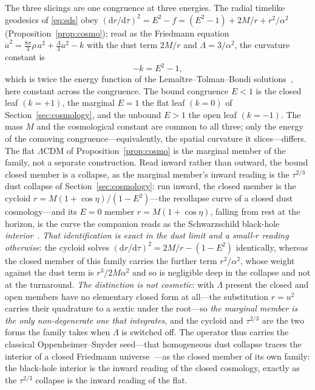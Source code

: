 \documentclass[11pt,a4paper]{article}
\theoremstyle{definition}
\newcommand{\dd}{\mathrm{d}}
\begin{document}
The three slicings are one congruence at three energies. The radial timelike geodesics of \eqref{eq:sds} obey $(\dd r/\dd\tau)^{2}=E^{2}-f=(E^{2}-1)+2M/r+r^{2}/\alpha^{2}$ (Proposition~\ref{prop:cosmo}); read as the Friedmann equation $\dot a^{2}=\tfrac{8\pi}{3}\rho\,a^{2}+\tfrac{\Lambda}{3}a^{2}-k$ with the dust term $2M/r$ and $\Lambda=3/\alpha^{2}$, the curvature constant is
\begin{equation}\label{eq:Ek}
-k=E^{2}-1,
\end{equation}
which is twice the energy function of the Lema\^itre--Tolman--Bondi solutions~\cite{Bondi1947}, here constant across the congruence.
The bound congruence $E<1$ is the closed leaf $(k=+1)$, the marginal $E=1$ the flat leaf $(k=0)$ of Section~\ref{sec:cosmology}, and the unbound $E>1$ the open leaf $(k=-1)$. The mass $M$ and the cosmological constant are common to all three; only the energy of the comoving congruence---equivalently, the spatial curvature it slices---differs. The flat $\Lambda$CDM of Proposition~\ref{prop:cosmo} is the marginal member of the family, not a separate construction. Read inward rather than outward, the bound closed member is a collapse, as the marginal member's inward reading is the $\tau^{2/3}$ dust collapse of Section~\ref{sec:cosmology}: run inward, the closed member is the cycloid $r=M(1+\cos\eta)/(1-E^{2})$---the recollapse curve of a closed dust cosmology---and its $E=0$ member $r=M(1+\cos\eta)$, falling from rest at the horizon, is the curve the companion reads as the Schwarzschild black-hole \emph{interior}~\cite{JanzenCircle}. \emph{That identification is exact in the dust limit and a small-$r$ reading otherwise}: the cycloid solves $(\dd r/\dd\tau)^{2}=2M/r-(1-E^{2})$ identically, whereas the closed member of this family carries the further term $r^{2}/\alpha^{2}$, whose weight against the dust term is $r^{3}/2M\alpha^{2}$ and so is negligible deep in the collapse and not at the turnaround. \emph{The distinction is not cosmetic}: with $\Lambda$ present the closed and open members have no elementary closed form at all---the substitution $r=u^{2}$ carries their quadrature to a sextic under the root---so \emph{the marginal member is the only non-degenerate one that integrates}, and the cycloid and $\tau^{2/3}$ are the two forms the family takes when $\Lambda$ is switched off. The operator thus carries the classical Oppenheimer--Snyder seed---that homogeneous dust collapse traces the interior of a closed Friedmann universe~\cite{Oppenheimer1939b}---as the closed member of its own family: the black-hole interior is the inward reading of the closed cosmology, exactly as the $\tau^{2/3}$ collapse is the inward reading of the flat.
\end{document}
